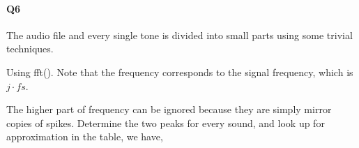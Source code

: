 \documentclass[11pt]{article}
\begin{document}
\paragraph{Q6}
The audio file and every single tone is divided into small parts using some trivial techniques.
\begin{figure}[H]
	\centering
\end{figure}
Using fft(). Note that the frequency corresponds to the signal frequency, which is $j\cdot fs$.
\begin{figure}[H]
	\centering
\end{figure}
The higher part of frequency can be ignored because they are simply mirror copies of spikes. Determine the two peaks for every sound, and look up for approximation in the table, we have,
\begin{figure}[H]
	\centering
\end{figure}
\end{document}
